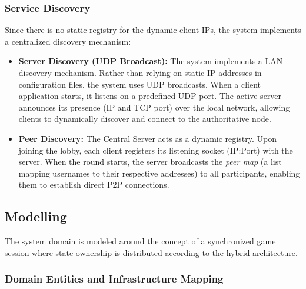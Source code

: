 \documentclass{scrartcl}
\begin{document}
\subsubsection*{Service Discovery}
Since there is no static registry for the dynamic client IPs, the system implements a centralized discovery mechanism:

\begin{itemize}
  \item \textbf{Server Discovery (UDP Broadcast):} The system implements a LAN discovery mechanism. 
    Rather than relying on static IP addresses in configuration files, the system uses UDP broadcasts. 
    When a client application starts, it listens on a predefined UDP port. 
    The active server announces its presence (IP and TCP port) over the local network, 
    allowing clients to dynamically discover and connect to the authoritative node.
    \item \textbf{Peer Discovery:} The Central Server acts as a dynamic registry. 
    Upon joining the lobby, each client registers its listening socket (IP:Port) with the server. 
    When the round starts, the server broadcasts the \textit{peer map} (a list mapping usernames to their respective addresses) to all participants, 
    enabling them to establish direct P2P connections.
\end{itemize}

\subsection{Modelling}\label{modelling}

The system domain is modeled around the concept of a synchronized game session 
where state ownership is distributed according to the hybrid architecture.

\subsubsection*{Domain Entities and Infrastructure Mapping}
\end{document}
